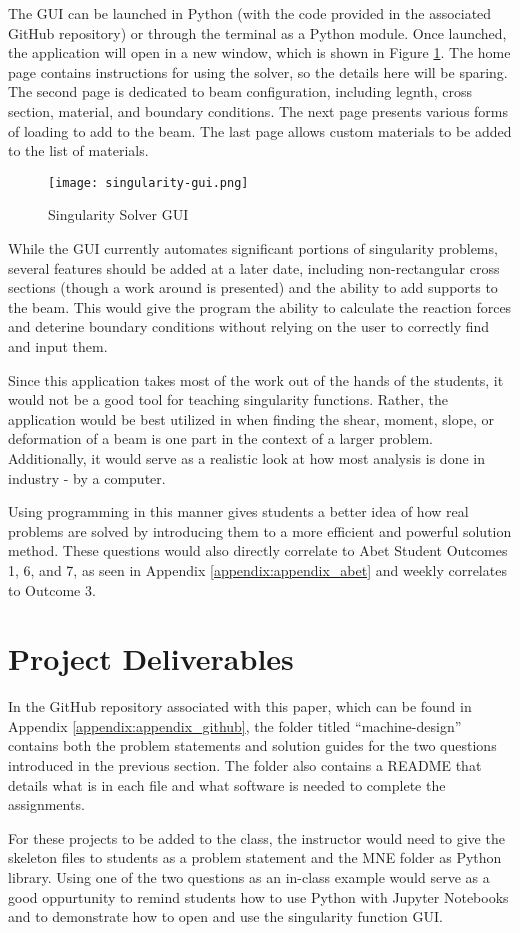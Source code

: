 The GUI can be launched in Python (with the code provided in the associated GitHub repository) or through
the terminal as a Python module. Once launched, the application will open in a new window, which is shown
in Figure \ref{fig:singularity-gui}. The home page contains instructions for using the solver, so the details 
here will be sparing. The second page is dedicated to beam configuration, including legnth, cross section, 
material, and boundary conditions. The next page presents various forms of loading to add
to the beam. The last page allows custom materials to be added to the list of materials.

\begin{figure}[h]
    \texttt{[image: singularity-gui.png]}
    \centering
    \caption{Singularity Solver GUI}
    \centering
    \label{fig:singularity-gui}
\end{figure}

While the GUI currently automates significant portions of singularity problems, several features should be
added at a later date, including non-rectangular cross sections (though a work around is presented) and
the ability to add supports to the beam. This would give the program the ability to calculate the reaction
forces and deterine boundary conditions without relying on the user to correctly find and input them.

Since this application takes most of the work out of the hands of the students, it would not be a good tool
for teaching singularity functions. Rather, the application would be best utilized in when finding the shear,
moment, slope, or deformation of a beam is one part in the context of a larger problem. Additionally, 
it would serve as a realistic look at how most analysis is done in industry - by a computer.

Using programming in this manner gives students a better idea of how real problems are solved by
introducing them to a more efficient and powerful solution method. These questions would also 
directly correlate to Abet Student Outcomes 1, 6, and 7, as seen in Appendix 
\ref{appendix:appendix_abet} and weekly correlates to Outcome 3.

\section{Project Deliverables}

In the GitHub repository associated with this paper, which can be found in Appendix \ref{appendix:appendix_github},
the folder titled ``machine-design'' contains both the problem statements and solution guides for the two questions
introduced in the previous section. The folder also contains a README that details what is in each file and 
what software is needed to complete the assignments. 

For these projects to be added to the class, the instructor would  need to give the skeleton files to 
students as a problem statement and the MNE folder as Python library. Using one of the two questions as an in-class
example would serve as a good oppurtunity to remind students how to use Python with Jupyter Notebooks and to 
demonstrate how to open and use the singularity function GUI.
